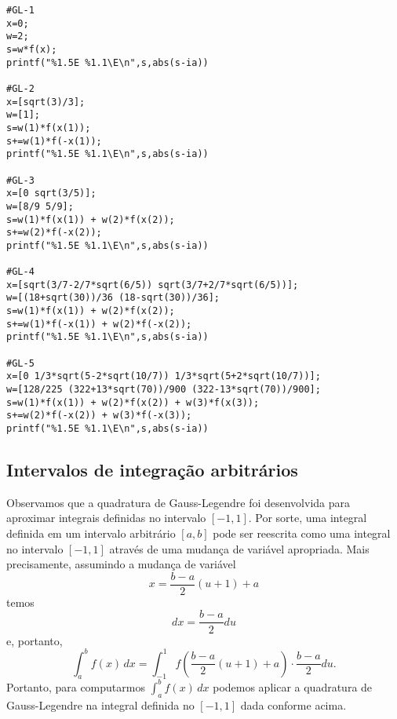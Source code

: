 \begin{ex}
\begin{verbatim}
#GL-1
x=0;
w=2;
s=w*f(x);
printf("%1.5E %1.1\E\n",s,abs(s-ia))

#GL-2
x=[sqrt(3)/3];
w=[1];
s=w(1)*f(x(1));
s+=w(1)*f(-x(1));
printf("%1.5E %1.1\E\n",s,abs(s-ia))

#GL-3
x=[0 sqrt(3/5)];
w=[8/9 5/9];
s=w(1)*f(x(1)) + w(2)*f(x(2));
s+=w(2)*f(-x(2));
printf("%1.5E %1.1\E\n",s,abs(s-ia))

#GL-4
x=[sqrt(3/7-2/7*sqrt(6/5)) sqrt(3/7+2/7*sqrt(6/5))];
w=[(18+sqrt(30))/36 (18-sqrt(30))/36];
s=w(1)*f(x(1)) + w(2)*f(x(2));
s+=w(1)*f(-x(1)) + w(2)*f(-x(2));
printf("%1.5E %1.1\E\n",s,abs(s-ia))

#GL-5
x=[0 1/3*sqrt(5-2*sqrt(10/7)) 1/3*sqrt(5+2*sqrt(10/7))];
w=[128/225 (322+13*sqrt(70))/900 (322-13*sqrt(70))/900];
s=w(1)*f(x(1)) + w(2)*f(x(2)) + w(3)*f(x(3));
s+=w(2)*f(-x(2)) + w(3)*f(-x(3));
printf("%1.5E %1.1\E\n",s,abs(s-ia))
\end{verbatim}
\fi
\end{ex}

\subsection{Intervalos de integração arbitrários}

Observamos que a quadratura de Gauss-Legendre foi desenvolvida para aproximar integrais definidas no intervalo $[-1, 1]$. Por sorte, uma integral definida em um intervalo arbitrário $[a, b]$ pode ser reescrita como uma integral no intervalo $[-1, 1]$ através de uma mudança de variável apropriada. Mais precisamente, assumindo a mudança de variável
\begin{equation}
  x = \frac{b-a}{2}(u+1)+a
\end{equation}
temos
\begin{equation}
  dx = \frac{b-a}{2}du
\end{equation}
e, portanto,
\begin{equation}
  \int_a^b f(x)\,dx = \int_{-1}^1 f\left(\frac{b-a}{2}(u+1)+a\right)\cdot \frac{b-a}{2}du.
\end{equation}
Portanto, para computarmos $\int_a^bf(x)\,dx$ podemos aplicar a quadratura de Gauss-Legendre na integral definida no $[-1, 1]$ dada conforme acima.

